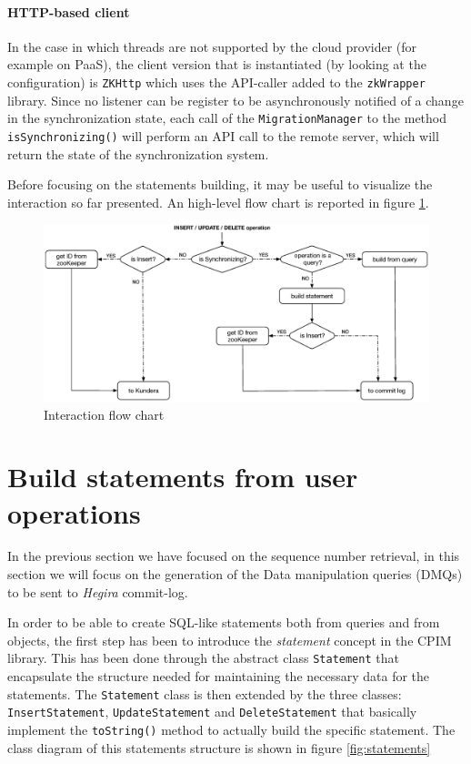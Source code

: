 \paragraph{HTTP-based client} In the case in which threads are not supported by the cloud provider (for example on PaaS), the client version that is instantiated (by looking at the configuration) is \texttt{ZKHttp} which uses the API-caller added to the \texttt{zkWrapper} library.
Since no listener can be register to be asynchronously notified of a change in the synchronization state, each call of the \texttt{MigrationManager} to the method \texttt{isSynchronizing()} will perform an API call to the remote server, which will return the state of the synchronization system.

\newparagraph Before focusing on the statements building, it may be useful to visualize the interaction so far presented. An high-level flow chart is reported in figure \ref{fig:flow-chart}.

\begin{figure}[tbh]
  \centering
  \includegraphics[width=13.5cm]{images/flow_chart}
  \caption{Interaction flow chart}
  \label{fig:flow-chart}
\end{figure} 

\section{Build statements from user operations}
\label{sec:statements}
In the previous section we have focused on the sequence number retrieval, in this section we will focus on the generation of the Data manipulation queries (DMQs) to be sent to \textit{Hegira} commit-log.

\newparagraph In order to be able to create SQL-like statements both from queries and from objects, the first step has been to introduce the \textit{statement} concept in the CPIM library. This has been done through the abstract class \texttt{Statement} that encapsulate the structure needed for maintaining the necessary data for the statements.
The \texttt{Statement} class is then extended by the three classes: \texttt{InsertStatement}, \texttt{UpdateStatement} and \texttt{DeleteStatement} that basically implement the \texttt{toString()} method to actually build the specific statement.
The class diagram of this statements structure is shown in figure \ref{fig:statements}

